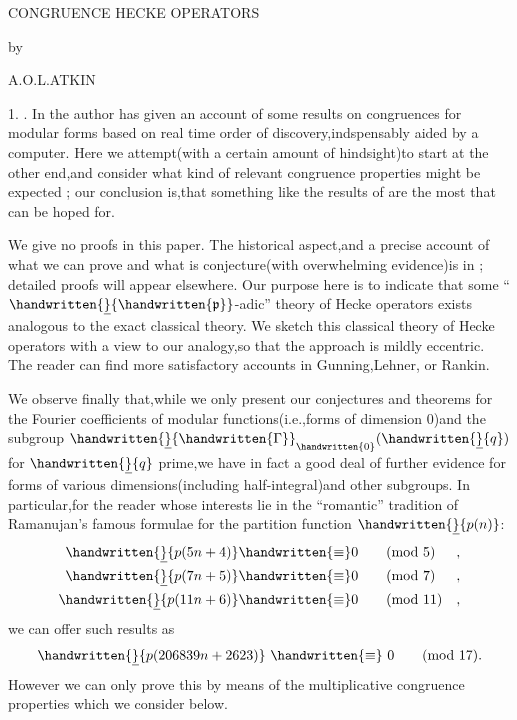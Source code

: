 \begin{center}
CONGRUENCE HECKE OPERATORS

by

A.O.L.ATKIN
\end{center}

1. . \quad In  the author has given an account of some results on congruences for modular forms based on real time order of discovery,indspensably aided by a computer. Here we attempt(with a certain amount of hindsight)to start at the other end,and consider what kind of relevant congruence properties might be expected   ; our conclusion is,that something like the results of  are the most that can be hoped for.

We give no proofs in this paper. The historical aspect,and a precise account of what we can prove and what is conjecture(with overwhelming evidence)is in ; detailed proofs will appear elsewhere. Our purpose here is to indicate that some \reversemarginpar{}\normalmarginpar``$\handwritten{\underline}{\handwritten{\mathfrak{p}}}$-adic'' theory of Hecke operators exists analogous to the exact classical theory. We sketch this classical theory of Hecke operators with a view to our analogy,so that the approach is mildly eccentric. The reader can find more satisfactory accounts in Gunning,Lehner, or Rankin.

We observe finally that,while we only present our conjectures and theorems for the Fourier coefficients of modular functions(i.e.,forms of dimension $0$)and the subgroup $\handwritten{\underline}{\handwritten{\Gamma}}_{\handwritten{0}}(\handwritten{\underline}{q})$ for $\handwritten{\underline}{q}$ prime,we have in fact a good deal of further evidence for forms of various dimensions(including half-integral)and other subgroups. In particular,for the reader whose interests lie in the ``romantic'' tradition of Ramanujan's famous formulae for the partition function $\handwritten{\underline}{p(n)}$:
\[
\begin{aligned}
\handwritten{\underline}{p(5n+4)}  &\handwritten{\equiv} 0 \qquad (\mathrm{mod}\ 5)  &,\\
\handwritten{\underline}{p(7n+5)}  &\handwritten{\equiv} 0 \qquad (\mathrm{mod}\ 7)  &,\\
\handwritten{\underline}{p(11n+6)} &\handwritten{\equiv} 0 \qquad (\mathrm{mod}\ 11) &,
\end{aligned}
\]
we can offer such results as
\[
\handwritten{\underline}{p(206839n+2623)}\ \handwritten{\equiv}\ 0 \qquad (\mathrm{mod}\ 17).
\]
However we can only prove this by means of the multiplicative congruence properties which we consider below.

